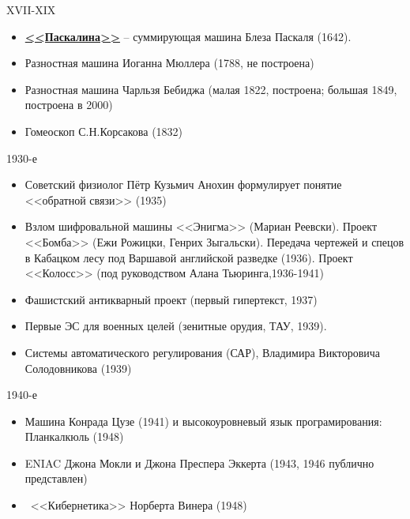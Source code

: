 \documentclass{beamer}
\begin{document}
  \begin{frame}{XVII-XIX}
     \begin{itemize}
        \item \textbf{
         \href{https://ru.wikipedia.org/wiki/\%D0\%A1\%D1\%83\%D0\%BC\%D0\%BC\%D0\%B8\%D1\%80\%D1\%83\%D1\%8E\%D1\%89\%D0\%B0\%D1\%8F_\%D0\%BC\%D0\%B0\%D1\%88\%D0\%B8\%D0\%BD\%D0\%B0_\%D0\%9F\%D0\%B0\%D1\%81\%D0\%BA\%D0\%B0\%D0\%BB\%D1\%8F}{<<Паскалина>>}}  -- суммирующая машина Блеза Паскаля (1642).
        \item Разностная машина Иоганна Мюллера (1788, не построена)
        \item Разностная машина Чарльзя Бебиджа (малая 1822, построена; большая 1849, построена в 2000)
        \item Гомеоскоп С.Н.Корсакова (1832) 
     \end{itemize}
  \end{frame}
 
   \begin{frame}{1930-е}
     \begin{itemize}
     	\item Советский физиолог 
     	Пётр Кузьмич Анохин
     	формулирует понятие <<обратной связи>> (1935)
 	    \item Взлом шифровальной машины <<Энигма>> (Мариан Реевски).
 	    Проект <<Бомба>> (Ежи Рожицки, Генрих Зыгальски).
 	    Передача чертежей и спецов в Кабацком лесу под Варшавой 
 	    английской разведке (1936).
 	    Проект <<Колосс>> (под руководством Алана Тьюринга,1936-1941)
 	    \item Фашистский антикварный проект (первый гипертекст, 1937)
 	    \item Первые ЭС для военных целей (зенитные орудия, ТАУ, 1939).
 	    \item Системы автоматического регулирования (САР),
 	    Владимира Викторовича Солодовникова (1939)
      \end{itemize}
   \end{frame}

     \begin{frame}{1940-е}
   \begin{itemize}
   	\item Машина Конрада Цузе (1941) 
   	и высокоуровневый язык програмирования: Планкалкюль (1948)
   	\item ENIAC Джона Мокли
   	и
   	Джона Преспера Эккерта
   	(1943, 1946 публично представлен)
   	\item ~<<Кибернетика>>
   	Норберта Винера (1948)
   \end{itemize}
\end{frame}
\end{document}
